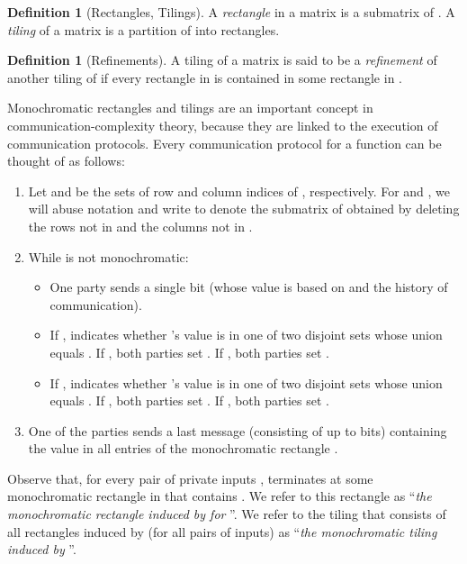 \documentclass{article}
\theoremstyle{theorem}
\theoremstyle{definition}
\newtheorem{definition}[theorem]{Definition}
\theoremstyle{remark}
\begin{document}
\begin{definition}[Rectangles, Tilings]\label{def:rect}
A \emph{rectangle} in a matrix  is a submatrix of . A
\emph{tiling} of a matrix  is a partition of  into rectangles.
\end{definition}

\begin{definition}[Refinements]
A tiling  of a matrix  is said to be a
\emph{refinement} of another tiling  of  if every
rectangle in  is contained in some rectangle in .
\end{definition}

Monochromatic rectangles and tilings are an important concept in
com\-mu\-ni\-ca\-tion-com\-plex\-i\-ty theory, because they are linked to the
execution of communication protocols. Every communication protocol
 for a function  can be thought of as follows:
\begin{enumerate}
\item Let  and  be the sets of row and column indices of , respectively.  For  and , we will abuse notation and write  to denote the submatrix of  obtained by deleting the rows not in  and the columns not in .

\item While  is not monochromatic:

\begin{itemize}

\item One party  sends a single bit  (whose value
is based on  and the history of communication).

\item If ,  indicates whether 's value is in one of
two disjoint sets  whose union equals . If ,
both parties set . If , both parties set .

\item If ,  indicates whether 's value is in one of
two disjoint sets  whose union equals . If ,
both parties set . If , both parties set .
\end{itemize}

\item One of the parties sends a last message (consisting of up to  bits) containing the value in all
entries of the monochromatic rectangle .
\end{enumerate}

Observe that, for every pair of private inputs , 
terminates at some monochromatic rectangle in  that contains
. We refer to this rectangle as ``\emph{the monochromatic
rectangle induced by  for }''. We refer to the tiling
that consists of all rectangles induced by  (for all pairs of
inputs) as  ``\emph{the monochromatic tiling induced by }''.
\end{document}
